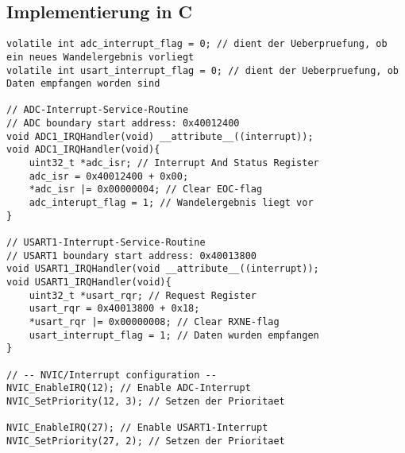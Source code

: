 \documentclass[11pt]{report}
\begin{document}
		\subsection{Implementierung in C}
			\begin{lstlisting}
volatile int adc_interrupt_flag = 0; // dient der Ueberpruefung, ob ein neues Wandelergebnis vorliegt
volatile int usart_interrupt_flag = 0; // dient der Ueberpruefung, ob Daten empfangen worden sind

// ADC-Interrupt-Service-Routine
// ADC boundary start address: 0x40012400
void ADC1_IRQHandler(void) __attribute__((interrupt));
void ADC1_IRQHandler(void){
	uint32_t *adc_isr; // Interrupt And Status Register
	adc_isr = 0x40012400 + 0x00;
	*adc_isr |= 0x00000004; // Clear EOC-flag
	adc_interupt_flag = 1; // Wandelergebnis liegt vor
}

// USART1-Interrupt-Service-Routine
// USART1 boundary start address: 0x40013800
void USART1_IRQHandler(void __attribute__((interrupt));
void USART1_IRQHandler(void){
	uint32_t *usart_rqr; // Request Register
	usart_rqr = 0x40013800 + 0x18;
	*usart_rqr |= 0x00000008; // Clear RXNE-flag
	usart_interrupt_flag = 1; // Daten wurden empfangen
}

// -- NVIC/Interrupt configuration --
NVIC_EnableIRQ(12); // Enable ADC-Interrupt
NVIC_SetPriority(12, 3); // Setzen der Prioritaet

NVIC_EnableIRQ(27); // Enable USART1-Interrupt
NVIC_SetPriority(27, 2); // Setzen der Prioritaet
			\end{lstlisting}
\end{document}
